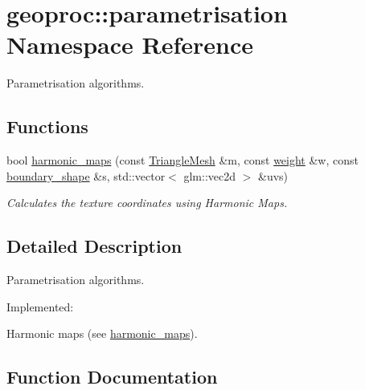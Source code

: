 \hypertarget{namespacegeoproc_1_1parametrisation}{}\section{geoproc\+:\+:parametrisation Namespace Reference}
\label{namespacegeoproc_1_1parametrisation}


Parametrisation algorithms.  


\subsection*{Functions}
\begin{DoxyCompactItemize}
\item 
bool \hyperlink{namespacegeoproc_1_1parametrisation_a7fff945ae22310764e66c98ffd42bdb9}{harmonic\+\_\+maps} (const \hyperlink{classgeoproc_1_1TriangleMesh}{Triangle\+Mesh} \&m, const \hyperlink{namespacegeoproc_a12e5a10581b53b9dd9a509127527f843}{weight} \&w, const \hyperlink{namespacegeoproc_a494da744a805b80f842402f0a806ccfc}{boundary\+\_\+shape} \&s, std\+::vector$<$ glm\+::vec2d $>$ \&uvs)
\begin{DoxyCompactList}\small\item\em Calculates the texture coordinates using Harmonic Maps. \end{DoxyCompactList}\end{DoxyCompactItemize}


\subsection{Detailed Description}
Parametrisation algorithms. 

Implemented\+:
\begin{DoxyItemize}
\item Harmonic maps (see \hyperlink{namespacegeoproc_1_1parametrisation_a7fff945ae22310764e66c98ffd42bdb9}{harmonic\+\_\+maps}). 
\end{DoxyItemize}

\subsection{Function Documentation}
\mbox{\label{namespacegeoproc_1_1parametrisation_a7fff945ae22310764e66c98ffd42bdb9}} 
